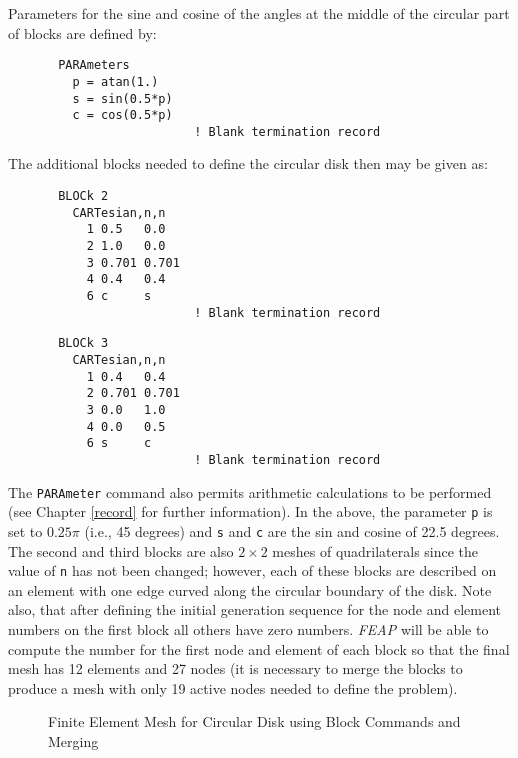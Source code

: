 Parameters for the sine and cosine of the angles at
the middle of the circular part of blocks are defined by:
\begin{verbatim}
       PARAmeters
         p = atan(1.)
         s = sin(0.5*p)
         c = cos(0.5*p)
                          ! Blank termination record
\end{verbatim}
The additional blocks needed to define the circular disk then may be given as:
\begin{verbatim}
       BLOCk 2
         CARTesian,n,n
           1 0.5   0.0
           2 1.0   0.0
           3 0.701 0.701
           4 0.4   0.4
           6 c     s
                          ! Blank termination record
\end{verbatim}
\begin{verbatim}
       BLOCk 3
         CARTesian,n,n
           1 0.4   0.4
           2 0.701 0.701
           3 0.0   1.0
           4 0.0   0.5
           6 s     c
                          ! Blank termination record
\end{verbatim}
The {\tt PARAmeter} command also permits arithmetic calculations
to be performed (see Chapter \ref{record} for further information).
In the above, the parameter {\tt p} is set to
$0.25 \pi$ (i.e., 45 degrees) and {\tt s} and {\tt c}
are the sin and cosine of 22.5 degrees.
The second and third blocks are also $2 \times 2$ meshes of quadrilaterals since
the value of {\tt n} has not been changed; however, each of these blocks are
described on an element with one edge curved along the circular boundary
of the disk.  Note also, that after defining the initial generation
sequence for the node and element numbers on the first block all others
have zero numbers. {\sl FEAP} will be able to compute the number for
the first node and element of each block so that the final mesh has 12
elements and 27 nodes (it is necessary to merge the blocks to produce
a mesh with only 19 active nodes needed to define the problem).

\begin{figure}[ht!]
\epsfxsize=2.8in
\centerline {\hfil {} \hfil}
\caption{Finite Element Mesh for Circular Disk using Block Commands and Merging}
\label{fig6}
\end{figure}

